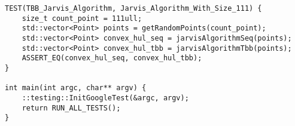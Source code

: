 \documentclass{report}
\begin{document}
\begin{lstlisting}
TEST(TBB_Jarvis_Algorithm, Jarvis_Algorithm_With_Size_111) {
    size_t count_point = 111ull;
    std::vector<Point> points = getRandomPoints(count_point);
    std::vector<Point> convex_hul_seq = jarvisAlgorithmSeq(points);
    std::vector<Point> convex_hul_tbb = jarvisAlgorithmTbb(points);
    ASSERT_EQ(convex_hul_seq, convex_hul_tbb);
}

int main(int argc, char** argv) {
    ::testing::InitGoogleTest(&argc, argv);
    return RUN_ALL_TESTS();
}
\end{lstlisting}
\end{document}
